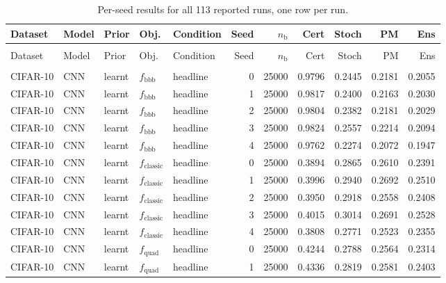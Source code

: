 {\scriptsize\begin{longtable}[]{@{}lllllr r r r r r@{}}
\caption{Per-seed results for all 113 reported runs, one row per run.}\label{tab:perseed}\\
\toprule\noalign{}
Dataset & Model & Prior & Obj. & Condition & Seed & $n_{\text{b}}$ & Cert & Stoch & PM & Ens \\
\midrule\noalign{}\endfirsthead
\multicolumn{11}{@{}l}{\emph{Table \thetable\ continued from previous page}}\\
\toprule\noalign{}
Dataset & Model & Prior & Obj. & Condition & Seed & $n_{\text{b}}$ & Cert & Stoch & PM & Ens \\
\midrule\noalign{}\endhead
\midrule\multicolumn{11}{r@{}}{\emph{continued on next page}}\\\endfoot
\bottomrule\noalign{}\endlastfoot
CIFAR-10 & CNN & learnt & $f_{\text{bbb}}$ & headline & 0 & 25000 & 0.9796 & 0.2445 & 0.2181 & 0.2055 \\
CIFAR-10 & CNN & learnt & $f_{\text{bbb}}$ & headline & 1 & 25000 & 0.9817 & 0.2400 & 0.2163 & 0.2030 \\
CIFAR-10 & CNN & learnt & $f_{\text{bbb}}$ & headline & 2 & 25000 & 0.9804 & 0.2382 & 0.2181 & 0.2029 \\
CIFAR-10 & CNN & learnt & $f_{\text{bbb}}$ & headline & 3 & 25000 & 0.9824 & 0.2557 & 0.2214 & 0.2094 \\
CIFAR-10 & CNN & learnt & $f_{\text{bbb}}$ & headline & 4 & 25000 & 0.9762 & 0.2274 & 0.2072 & 0.1947 \\
\addlinespace[2pt]
CIFAR-10 & CNN & learnt & $f_{\text{classic}}$ & headline & 0 & 25000 & 0.3894 & 0.2865 & 0.2610 & 0.2391 \\
CIFAR-10 & CNN & learnt & $f_{\text{classic}}$ & headline & 1 & 25000 & 0.3996 & 0.2940 & 0.2692 & 0.2510 \\
CIFAR-10 & CNN & learnt & $f_{\text{classic}}$ & headline & 2 & 25000 & 0.3950 & 0.2918 & 0.2558 & 0.2408 \\
CIFAR-10 & CNN & learnt & $f_{\text{classic}}$ & headline & 3 & 25000 & 0.4015 & 0.3014 & 0.2691 & 0.2528 \\
CIFAR-10 & CNN & learnt & $f_{\text{classic}}$ & headline & 4 & 25000 & 0.3808 & 0.2771 & 0.2523 & 0.2355 \\
\addlinespace[2pt]
CIFAR-10 & CNN & learnt & $f_{\text{quad}}$ & headline & 0 & 25000 & 0.4244 & 0.2788 & 0.2564 & 0.2314 \\
CIFAR-10 & CNN & learnt & $f_{\text{quad}}$ & headline & 1 & 25000 & 0.4336 & 0.2819 & 0.2581 & 0.2403 \\

\end{longtable}}
